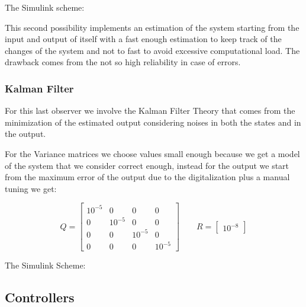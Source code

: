                 The Simulink scheme:


                This second possibility implements an estimation of the system  starting from the input and output of itself with a fast enough estimation to keep track of the changes of the system and not to fast to avoid excessive computational load. The drawback comes from the not so high reliability in case of errors.

            \subsubsection{Kalman Filter}

                For this last observer we involve the Kalman Filter Theory that comes from the minimization of the estimated output considering noises in both the states and in the output. 

                For the Variance matrices we choose values small enough because we get a model of the system that we consider correct enough, instead for the output we start from the maximum error of the output due to the digitalization plus a manual tuning we get:

                \begin{equation*}
                    Q = 
                        \begin{bmatrix}
                        10^{-5} & 0 & 0 & 0 \\
                        0 & 10^{-5} & 0 & 0 \\
                        0 & 0 & 10^{-5} & 0 \\
                        0 & 0 & 0 & 10^{-5} 
                    \end{bmatrix} 
                    \qquad 
                    R = 
                    \begin{bmatrix}
                        10^{-8} 
                        \end{bmatrix} 
                \end{equation*} 

                The Simulink Scheme:


        \subsection{Controllers}
            

